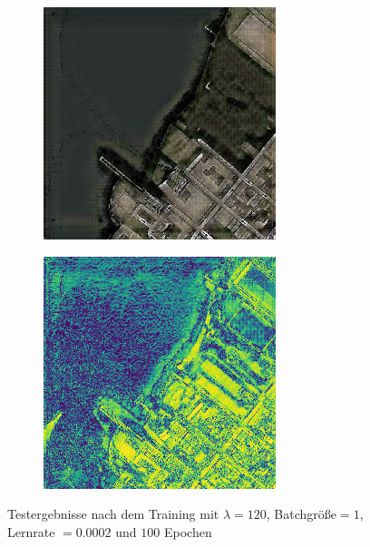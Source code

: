 \begin{figure}[ht]
\begin{subfigure}[t]{.14\textwidth}
  \end{subfigure}
  \begin{subfigure}[t]{.14\textwidth}
    \centering
    \includegraphics[width=\linewidth]{images/cycleGanResults/Satelite8_Ld120_E100_E0002.jpg}
  \end{subfigure}
  \begin{subfigure}[t]{.14\textwidth}
    \centering
    \includegraphics[width=\linewidth]{images/cycleGanResults/Satelite1_diff.png}
  \end{subfigure}
  \caption{Testergebnisse nach dem Training mit $\lambda=120$, Batchgröße$=1$, Lernrate $=0.0002$ und $100$ Epochen}
  \label{evaluation:cycleGan_Testergebnisse}
\end{figure}

